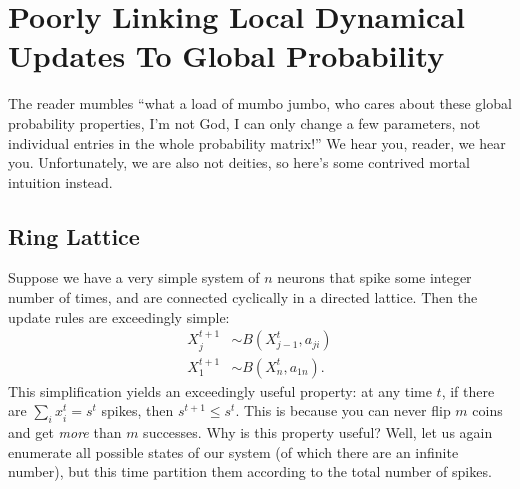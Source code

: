 \documentclass[superscriptaddress]{revtex4-1}
\begin{document}
\section{Poorly Linking Local Dynamical Updates To Global Probability}
The reader mumbles ``what a load of mumbo jumbo, who cares about these global probability properties, I'm not God, I can only change a few parameters, not individual entries in the whole probability matrix!'' We hear you, reader, we hear you. Unfortunately, we are also not deities, so here's some contrived mortal intuition instead.






\subsection{Ring Lattice}
Suppose we have a very simple system of $n$ neurons that spike some integer number of times, and are connected cyclically in a directed lattice. Then the update rules are exceedingly simple:
\begin{align*}
X_j^{t+1} &\sim B(X_{j-1}^t, a_{ji})\\
X_1^{t+1} &\sim B(X_n^t, a_{1n}).
\end{align*}
This simplification yields an exceedingly useful property: at any time $t$, if there are $\sum_i x_i^t = s^t$ spikes, then $s^{t+1} \leq s^t$. This is because you can never flip $m$ coins and get \emph{more} than $m$ successes. Why is this property useful? Well, let us again enumerate all possible states of our system (of which there are an infinite number), but this time partition them according to the total number of spikes.
\end{document}
